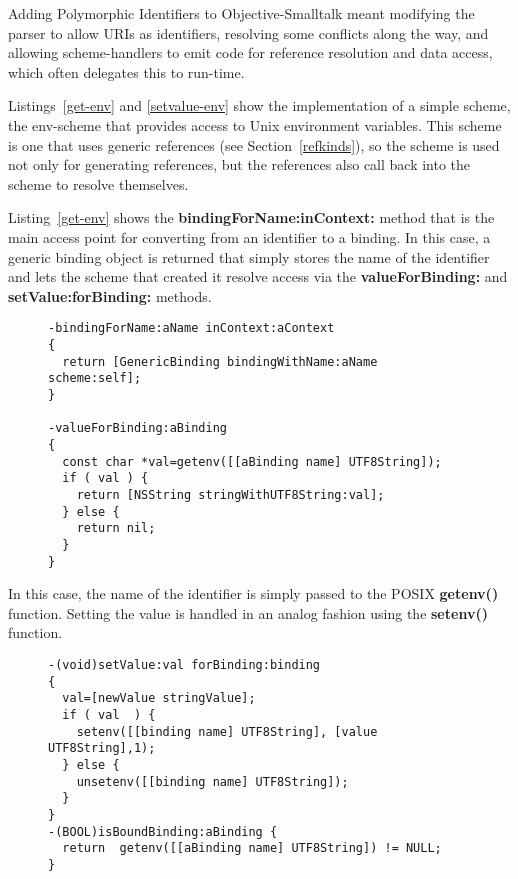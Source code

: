 \documentclass[preprint]{sigplanconf}
\begin{document}
Adding Polymorphic Identifiers to Objective-Smalltalk meant modifying the parser to allow URIs as identifiers,
resolving some conflicts along the way,
and allowing scheme-handlers to emit code for reference resolution and data access, which often
delegates this to run-time.



Listings~\ref{get-env} and \ref{setvalue-env} show the implementation of a simple scheme,
the env-scheme that provides access to Unix environment variables.  This scheme is
one that uses generic references (see Section~\ref{refkinds}), so the scheme is used
not only for generating references, but the references also call back into the scheme
to resolve themselves.

Listing~\ref{get-env} 
shows the {\bf bindingForName:inContext:} method that is the main access point for
converting from an identifier to a binding.  In this case, a generic binding object is returned
that simply stores the name of the identifier and lets the scheme that created it resolve
access via the {\bf valueForBinding:} and {\bf setValue:forBinding:} methods.


\begin{figure}[htbp]
\begin{lstlisting}[style=numbers,label=get-env,caption=Basic lookup in env: scheme.]
-bindingForName:aName inContext:aContext
{
  return [GenericBinding bindingWithName:aName scheme:self];
}

-valueForBinding:aBinding
{
  const char *val=getenv([[aBinding name] UTF8String]);
  if ( val ) {
    return [NSString stringWithUTF8String:val];
  } else {
    return nil;
  }
}
\end{lstlisting}
\end{figure}

In this case, the name of the identifier is simply passed to the POSIX {\bf getenv()} function.
Setting the value is handled in an analog fashion using the {\bf setenv()} function.


\begin{figure}[htbp]
\begin{lstlisting}[style=numbers,label=setvalue-env,caption=Set and check value in env: scheme.]
-(void)setValue:val forBinding:binding
{
  val=[newValue stringValue];
  if ( val  ) {
    setenv([[binding name] UTF8String], [value UTF8String],1);
  } else {
    unsetenv([[binding name] UTF8String]);
  }
}
-(BOOL)isBoundBinding:aBinding {
  return  getenv([[aBinding name] UTF8String]) != NULL;
}
\end{lstlisting}
\end{figure}
\end{document}
